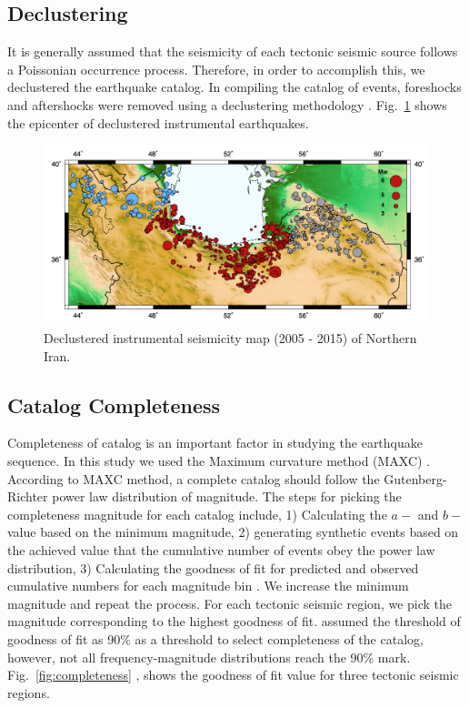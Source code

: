 \subsection{Declustering}
\noindent
It is generally assumed that the seismicity of each tectonic seismic source follows a Poissonian occurrence process. Therefore, in order to accomplish this, we declustered the earthquake catalog. In compiling the catalog of events, foreshocks and aftershocks were removed using a declustering methodology \citet{Gardner1974}. Fig.~\ref{fig:seismicity} shows the epicenter of declustered instrumental  earthquakes.

\begin{figure} [ht]
\centering
\includegraphics[scale=0.6]{figures/pdf/Figure02.pdf} 
\caption{Declustered instrumental seismicity map (2005 - 2015) of Northern Iran.}
\label{fig:seismicity}
\end{figure}


\subsection{Catalog Completeness}
\noindent
Completeness of catalog is an important factor in studying the earthquake sequence.  In this study we used the Maximum curvature method (MAXC) \citep{Wiemer2000}. According to MAXC method, a complete catalog should follow the Gutenberg-Richter power law distribution of magnitude. The steps for picking the completeness magnitude for each catalog include, 1) Calculating the $a-$ and $b-$ value based on the minimum magnitude, 2) generating  synthetic events based on the achieved value that the cumulative number of events obey the power law distribution, 3) Calculating the goodness of fit for predicted and observed cumulative numbers for each magnitude bin \citep{Wiemer2000}. We increase the minimum magnitude and repeat the process. For each tectonic seismic region, we pick the magnitude corresponding to the highest goodness of fit.  \citet{Wiemer2000} assumed the threshold of goodness of fit as 90\% as a threshold to select completeness of the catalog, however,  not all frequency-magnitude distributions reach the 90\% mark. Fig.~\ref{fig:completeness} , shows the goodness of fit value for three tectonic seismic regions. 

